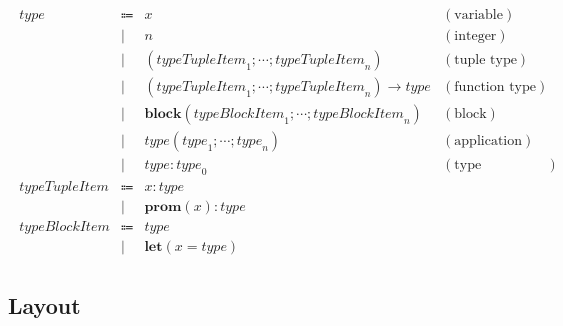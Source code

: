 \begin{align*}
  \begin{array}{rclr}
  \mathit{type}
  & \Coloneq & x &(\text{variable}) \\
  & \mid & n &(\text{integer}) \\
  & \mid & (\mathit{typeTupleItem}_1; \cdots; \mathit{typeTupleItem}_n) &(\text{tuple type}) \\
  & \mid & (\mathit{typeTupleItem}_1; \cdots; \mathit{typeTupleItem}_n) \rightarrow \mathit{type} &(\text{function type}) \\
  & \mid & \mathbf{block}(\mathit{typeBlockItem}_1; \cdots; \mathit{typeBlockItem}_n) &(\text{block}) \\
  & \mid & \mathit{type}(\mathit{type}_1; \cdots; \mathit{type}_n) &(\text{application}) \\
  & \mid & \mathit{type}: \mathit{type}_0 &(\text{type annotation}) \\
  \mathit{typeTupleItem}
  & \Coloneq & x: \mathit{type} \\
  & \mid & \mathbf{prom}(x): \mathit{type} \\
  \mathit{typeBlockItem}
  & \Coloneq & \mathit{type} \\
  & \mid & \mathbf{let}(x = \mathit{type})
  \end{array}
\end{align*}

\subsection{Layout}
